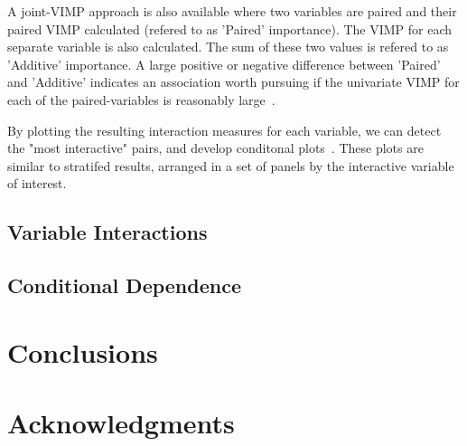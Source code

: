 \documentclass[nojss,letterpaper]{jss}\usepackage[]{graphicx}\usepackage[]{color}
\begin{document}
A joint-VIMP approach is also available where two variables are paired and their paired VIMP calculated (refered to as 'Paired' importance). The VIMP for each separate variable is also calculated. The sum of these two values is refered to as 'Additive' importance. A large positive or negative difference between 'Paired' and 'Additive' indicates an association worth pursuing if the univariate VIMP for each of the paired-variables is reasonably large~\citep{Ishwaran:2007}.

By plotting the resulting interaction measures for each variable, we can detect the "most interactive" pairs, and develop conditonal plots~\cite{}. These plots are similar to stratifed results, arranged in a set of panels by the interactive variable of interest. 


\subsection{Variable Interactions}


\subsection{Conditional Dependence}\label{S:coplots}

\section{Conclusions} \label{S:conclusion}


\section{Acknowledgments} \label{S:acknowledge}



\end{document}
